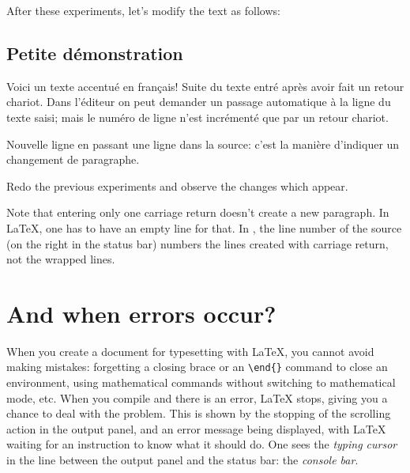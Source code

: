 
After these experiments, let's modify the text as follows:
\begin{example}

\maketitle
\tableofcontents

\section{Petite démonstration}

Voici un texte accentué en français!
Suite du texte entré après avoir fait un retour chariot. Dans
l'éditeur on peut demander un passage automatique à la ligne
du texte saisi; mais le numéro de ligne n'est incrémenté que par un
retour chariot.

Nouvelle ligne en passant une ligne dans la source: c'est la
manière d'indiquer un changement de paragraphe.


\end{example}
Redo the previous experiments and observe the changes which appear.

Note that entering only one carriage return doesn't create a new paragraph. In {\LaTeX}, one has to have an empty line for that. In {\Tw}, the line number of the source (on the right in the status bar) numbers the lines created with carriage return, not the wrapped lines.

\section{And when errors occur?}

When you create a document for typesetting with {\LaTeX}, you cannot avoid making mistakes: forgetting a closing brace or an \verb|\end{}| command to close an environment, using mathematical commands without switching to mathematical mode, etc. When you compile and there is an error, {\LaTeX} stops, giving you a chance to deal with the problem. This is shown by the stopping of the scrolling action in the output panel, and an error message being displayed, with {\LaTeX} waiting for an instruction to know what it should do. One sees the \emph{typing cursor} in the line between the output panel and the status bar: the \emph{console bar}.

